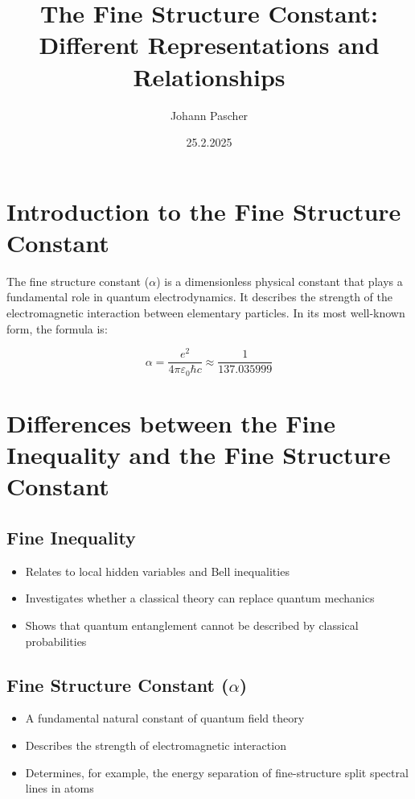 \documentclass{article}
\title{The Fine Structure Constant: Different Representations and Relationships}
\author{Johann Pascher}
\date{25.2.2025}
\begin{document}
	
	\maketitle
	\tableofcontents
	\section{Introduction to the Fine Structure Constant}
	
	The fine structure constant ($\alpha$) is a dimensionless physical constant that plays a fundamental role in quantum electrodynamics. It describes the strength of the electromagnetic interaction between elementary particles. In its most well-known form, the formula is:
	
	\begin{equation}
		\alpha = \frac{e^2}{4\pi\varepsilon_0\hbar c} \approx \frac{1}{137.035999}
	\end{equation}
	
	\section{Differences between the Fine Inequality and the Fine Structure Constant}
	
	\subsection{Fine Inequality}
	\begin{itemize}
		\item Relates to local hidden variables and Bell inequalities
		\item Investigates whether a classical theory can replace quantum mechanics
		\item Shows that quantum entanglement cannot be described by classical probabilities
	\end{itemize}
	
	\subsection{Fine Structure Constant ($\alpha$)}
	\begin{itemize}
		\item A fundamental natural constant of quantum field theory
		\item Describes the strength of electromagnetic interaction
		\item Determines, for example, the energy separation of fine-structure split spectral lines in atoms
	\end{itemize}
	
\end{document}
